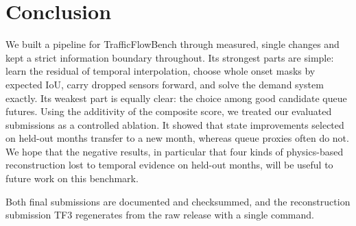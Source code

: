 \section{Conclusion}\label{sec:conclusion}

We built a pipeline for TrafficFlowBench through measured, single changes and kept a strict information boundary
throughout. Its strongest parts are simple: learn the residual of temporal interpolation, choose whole onset masks
by expected IoU, carry dropped sensors forward, and solve the demand system exactly. Its weakest part is equally
clear: the choice among good candidate queue futures. Using the additivity of the composite score, we treated our
evaluated submissions as a controlled ablation. It showed that state improvements selected on held-out months transfer
to a new month, whereas queue proxies often do not. We hope that the negative results, in particular that four kinds
of physics-based reconstruction lost to temporal evidence on held-out months, will be useful to future work on this
benchmark.

Both final submissions are documented and checksummed, and the reconstruction submission TF3 regenerates from the raw
release with a single command.
